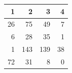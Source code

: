 \begin{tabular}{rrrr}
\toprule
1 & 2 & 3 & 4 \\
\midrule
26 & 75 & 49 & 7 \\
6 & 28 & 35 & 1 \\
1 & 143 & 139 & 38 \\
72 & 31 & 8 & 0 \\
\bottomrule
\end{tabular}
